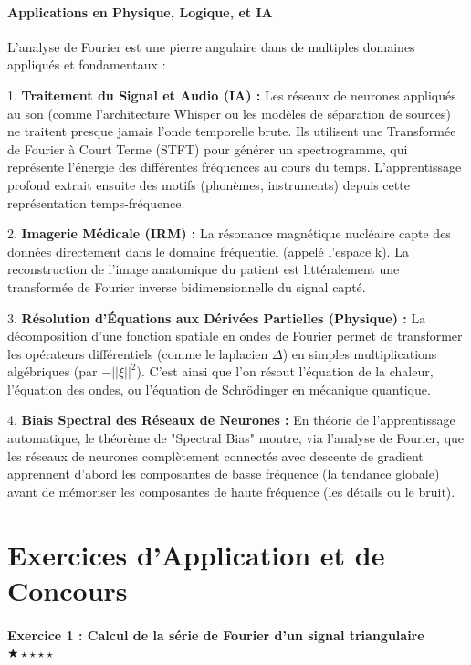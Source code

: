 \documentclass[11pt,a4paper]{article}
\begin{document}
\subsection{Applications en Physique, Logique, et IA}

L'analyse de Fourier est une pierre angulaire dans de multiples domaines appliqués et fondamentaux :

1.  \textbf{Traitement du Signal et Audio (IA) :}
    Les réseaux de neurones appliqués au son (comme l'architecture Whisper ou les modèles de séparation de sources) ne traitent presque jamais l'onde temporelle brute. Ils utilisent une Transformée de Fourier à Court Terme (STFT) pour générer un spectrogramme, qui représente l'énergie des différentes fréquences au cours du temps. L'apprentissage profond extrait ensuite des motifs (phonèmes, instruments) depuis cette représentation temps-fréquence.

2.  \textbf{Imagerie Médicale (IRM) :}
    La résonance magnétique nucléaire capte des données directement dans le domaine fréquentiel (appelé l'espace k). La reconstruction de l'image anatomique du patient est littéralement une transformée de Fourier inverse bidimensionnelle du signal capté.

3.  \textbf{Résolution d'Équations aux Dérivées Partielles (Physique) :}
    La décomposition d'une fonction spatiale en ondes de Fourier permet de transformer les opérateurs différentiels (comme le laplacien $\Delta$) en simples multiplications algébriques (par $-||\xi||^2$). C'est ainsi que l'on résout l'équation de la chaleur, l'équation des ondes, ou l'équation de Schrödinger en mécanique quantique.

4.  \textbf{Biais Spectral des Réseaux de Neurones :}
    En théorie de l'apprentissage automatique, le théorème de "Spectral Bias" montre, via l'analyse de Fourier, que les réseaux de neurones complètement connectés avec descente de gradient apprennent d'abord les composantes de basse fréquence (la tendance globale) avant de mémoriser les composantes de haute fréquence (les détails ou le bruit).


\newpage
\part{Exercices d'Application et de Concours}
\subsection*{Exercice 1 : Calcul de la série de Fourier d'un signal triangulaire \quad $\bigstar\star\star\star\star$}
\end{document}
